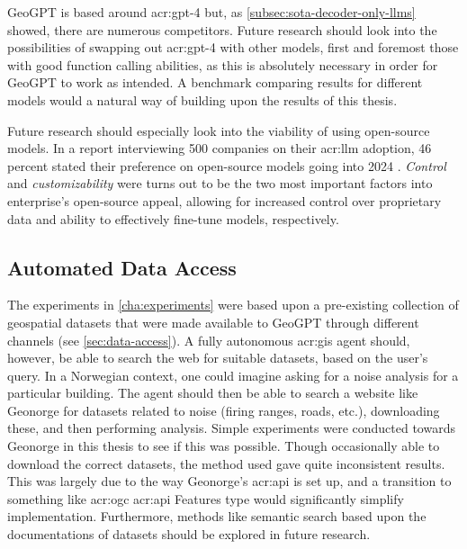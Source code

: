 GeoGPT is based around \acrshort{acr:gpt}-4 but, as \autoref{subsec:sota-decoder-only-llms} showed, there are numerous competitors. Future research should look into the possibilities of swapping out \acrshort{acr:gpt}-4 with other models, first and foremost those with good function calling abilities, as this is absolutely necessary in order for GeoGPT to work as intended. A benchmark comparing results for different models would a natural way of building upon the results of this thesis.

Future research should especially look into the viability of using open-source models. In a report interviewing 500 companies on their \acrshort{acr:llm} adoption, 46 percent stated their preference on open-source models going into 2024 \citep{wangsarah16ChangesWay2024}. \textit{Control} and \textit{customizability} were turns out to be the two most important factors into enterprise's open-source appeal, allowing for increased control over proprietary data and ability to effectively fine-tune models, respectively.

\subsection{Automated Data Access}

The experiments in \autoref{cha:experiments} were based upon a pre-existing collection of geospatial datasets that were made available to GeoGPT through different channels (see \autoref{sec:data-access}). A fully autonomous \acrshort{acr:gis} agent should, however, be able to search the web for suitable datasets, based on the user's query. In a Norwegian context, one could imagine asking for a noise analysis for a particular building. The agent should then be able to search a website like Geonorge for datasets related to noise (firing ranges, roads, etc.), downloading these, and then performing analysis. Simple experiments were conducted towards Geonorge in this thesis to see if this was possible. Though occasionally able to download the correct datasets, the method used gave quite inconsistent results.  This was largely due to the way Geonorge's \acrshort{acr:api} is set up, and a transition to something like \acrshort{acr:ogc} \acrshort{acr:api} Features type  would significantly simplify implementation. Furthermore, methods like semantic search based upon the documentations of datasets should be explored in future research.